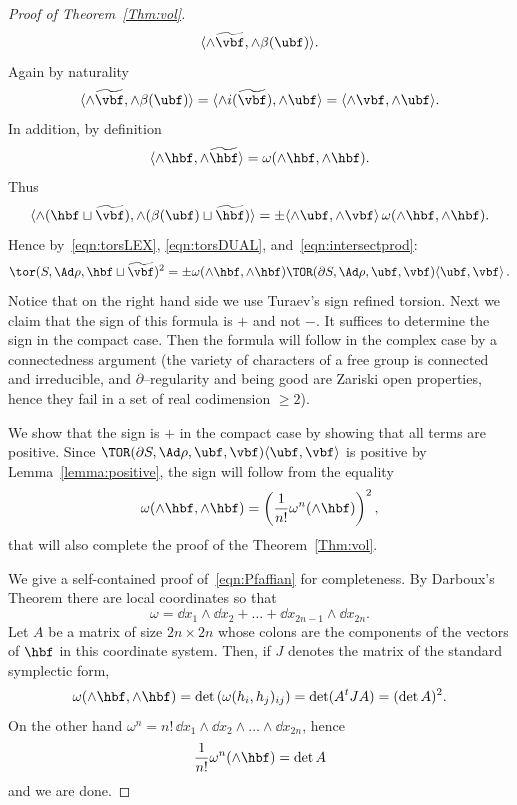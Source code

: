 \begin{proof}[Proof of Theorem~\ref{Thm:vol}]
\[\langle \wedge \widetilde{\vbf}, \wedge \beta(\ubf) \rangle.
\]
Again by naturality
\[
\langle \wedge \widetilde{\vbf}, \wedge \beta(\ubf) \rangle =
\langle \wedge i(\widetilde{\vbf}), \wedge \ubf \rangle =
\langle \wedge {\vbf},\wedge \ubf \rangle.
\]
In addition, by definition
\[
\langle \wedge{\hbf}, \wedge\widetilde{{\hbf}} \rangle = \omega(\wedge {\hbf}, \wedge{\hbf}).
\]
Thus
\begin{equation}\label{eqn:intersectprod}
\langle \wedge(\hbf\sqcup \widetilde{\vbf}), \wedge (\beta (\ubf) \sqcup \widetilde{\hbf}) \rangle=
\pm \langle\wedge \ubf,\wedge \vbf\rangle \, \omega(\wedge {\hbf}, \wedge{\hbf}).
\end{equation}
Hence by~\eqref{eqn:torsLEX}, \eqref{eqn:torsDUAL}, and~\eqref{eqn:intersectprod}:
\begin{equation*}
\tor(S,\Ad\rho, \hbf\sqcup \widetilde{\vbf})^2=
\pm
\omega(\wedge {\hbf}, \wedge {\hbf}) \TOR(\partial S,\Ad\rho, \ubf, \vbf) \langle \ubf, \vbf \rangle \,.
\end{equation*}
Notice that on the right hand side we use Turaev's sign refined torsion. Next we claim that the sign of this formula is $+$ and not $-$. It suffices to determine the sign in the compact case. Then the formula will follow in the complex case by a connectedness argument (the variety of characters of a free group is connected and irreducible, and $\partial$--regularity and being good are Zariski open properties, hence they fail in a set of real codimension $\geq 2$).

We show that the sign is $+$ in the compact case by showing that all terms are positive. Since $\TOR(\partial S,\Ad\rho, \ubf, \vbf) \langle \ubf, \vbf \rangle$ is positive by Lemma~\ref{lemma:positive}, the sign will follow from the equality
\begin{equation}\label{eqn:Pfaffian}
\omega(\wedge {\hbf}, \wedge {\hbf}) = \left(
\frac{1}{n!}\omega^n(\wedge \hbf)
\right)^2,
\end{equation}
that will also complete the proof of the Theorem~\ref{Thm:vol}.

We give a self-contained proof of~\eqref{eqn:Pfaffian} for completeness. By Darboux's Theorem there are local coordinates so that
\[
\omega=\dd x_1\wedge \dd x_2+\dots+ \dd x_{2 n-1}\wedge \dd x_{2n}.
\]
Let $A$ be a matrix of size $2n\times 2n$ whose colons are the components of the vectors of $\hbf$ in this coordinate system. Then, if $J$ denotes the matrix of the standard symplectic form,
\[
\omega(\wedge {\hbf}, \wedge {\hbf})=\det\left(\omega(h_i,h_j)_{ij} \right)=\det (A^t J A)= (\det A)^2.
\]
On the other hand $
\omega^n= n! \, \dd x_1\wedge \dd x_2\wedge\dots \wedge \dd x_{2n}$, hence
\[
\frac{1}{n!}\omega^n(\wedge \hbf)=\det A
\]
and we are done.
\end{proof}

